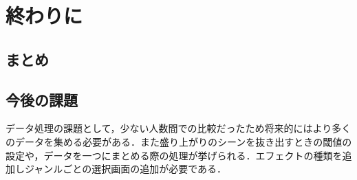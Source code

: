 \chapter{終わりに}

\section{まとめ}
\section{今後の課題}
データ処理の課題として，少ない人数間での比較だったため将来的にはより多くのデータを集める必要がある．また盛り上がりのシーンを抜き出すときの閾値の設定や，データを一つにまとめる際の処理が挙げられる．エフェクトの種類を追加しジャンルごとの選択画面の追加が必要である．